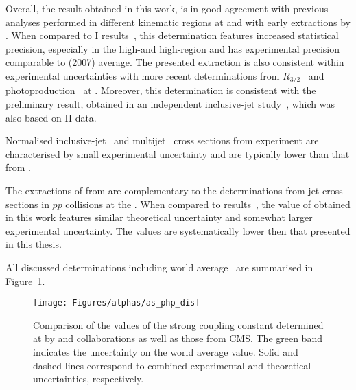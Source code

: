 Overall, the result obtained in this work, is in good agreement with previous analyses performed in different kinematic regions at \zeus and with early extractions by \hone. When compared to \hera I results~\cite{pl:b649:12,Aktas:2007aa,pl:b560:7}, this determination features increased statistical precision, especially in the high-\etjetb and high-\qsq region and has experimental precision comparable to \hera (2007) average. The presented extraction is also consistent within experimental uncertainties with more recent determinations from $R_{3/2}$~\cite{thesis:behr:2010} and photoproduction~\cite{np:b864:1} at \zeus. Moreover, this \asz determination is consistent with the preliminary result, obtained in an independent inclusive-jet study~\cite{upub:zp10002}, which was also based on \hera II data. %

Normalised inclusive-jet~\cite{epj:c65:363} and multijet~\cite{epj:c75:65} cross sections from \hone experiment are characterised by small experimental uncertainty and are typically lower than that from \zeus. %

The extractions of \asz from \hera are complementary to the determinations from jet cross sections in $pp$ collisions at the \lhc. When compared to \cms results~\cite{Chatrchyan:2012bja,Chatrchyan:2013txa,CMS:2014mna}, the value of \asz obtained in this work features similar theoretical uncertainty and somewhat larger experimental uncertainty. The \cms values are systematically lower then that presented in this thesis.

All discussed determinations including world average~\cite{PDG:2014} are summarised in Figure~\ref{fig:as_php_dis}.
\begin{figure}[htpb]
	\centering
		\texttt{[image: Figures/alphas/as\_php\_dis]}
	\caption{Comparison of the values of the strong coupling constant determined at \hera by \hone and \zeus collaborations as well as those from CMS. The green band indicates the uncertainty on the world average \as value. Solid and dashed lines correspond to combined experimental and theoretical uncertainties, respectively.}
	\label{fig:as_php_dis}
\end{figure}
